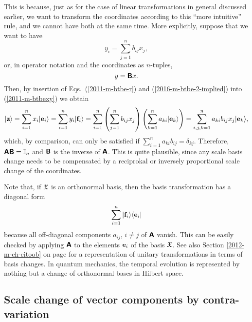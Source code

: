 This is because, just as for the case of linear transformations in general discussed earlier,
we want to transform the coordinates according to this ``more intuitive'' rule, and we cannot have both
at the same time.
More explicitly, suppose that we want to have
\begin{equation}
y_i =\sum_{j=1}^n b_{ij} x_j
,
\label{2016-m-btbe-2-implied}
\end{equation}
or, in operator notation and the coordinates as $n$-tuples,
\begin{equation}
y = \textsf{\textbf{B}} x
.
\label{2016-m-btbe-2-impliedm}
\end{equation}
Then, by insertion of  Eqs.~(\ref{2011-m-btbe-r}) and (\ref{2016-m-btbe-2-implied}) into (\ref{2011-m-btbexy})
we obtain
\begin{equation}
\vert {\bf z} \rangle =
\sum_{i=1}^n x_i \vert  {\bf e}_i  \rangle
=
\sum_{i=1}^n  y_i \vert {\bf f}_i \rangle
= \sum_{i=1}^n \left( \sum_{j=1}^n b_{ij} x_j \right)   \left( \sum_{k=1}^n a_{ki} \vert {\bf e}_k \rangle \right)
= \sum_{i,j,k=1}^n  a_{ki} b_{ij}  x_j \vert {\bf e}_k  \rangle
,
\label{2016-m-btbexy}
\end{equation}
which, by comparison, can only be satisfied if  $\sum_{i=1}^n  a_{ki} b_{ij} = \delta_{kj}$.
Therefore, $\textsf{\textbf{A}}\textsf{\textbf{B}} = {\Bbb I}_n$ and
$\textsf{\textbf{B}}$   is the inverse of
$\textsf{\textbf{A}}$.
This is quite plausible, since any scale basis change needs to be compensated by a reciprokal or inversely proportional
scale change of the coordinates.




Note that, if  ${\frak X}$ is an orthonormal basis,
then the basis transformation has a diagonal form
\begin{equation}
\sum_{i=1}^n \vert {\bf f}_i \rangle \langle {\bf e}_i \vert
\label{2013-m-ch-fdvs-dftm}
\end{equation}
because all off-diagonal components $a_{ij}$, $i\neq j$ of $\textsf{\textbf{A}}$
vanish.
This can be easily checked by applying $\textsf{\textbf{A}}$ to the elements ${\bf e}_i $ of the basis ${\frak X}$.
See also Section
\ref{2012-m-ch-citoob} on page \pageref{2012-m-ch-citoob}
for a representation of unitary transformations in terms of basis changes.
In quantum mechanics, the temporal evolution is represented by nothing but a change of orthonormal bases in Hilbert space.



\subsection{Scale change of vector components by contra-variation}



